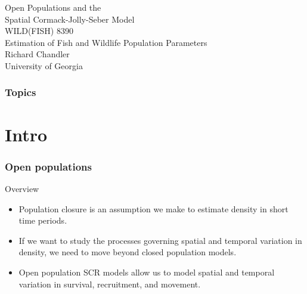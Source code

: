 \documentclass[color=usenames,dvipsnames]{beamer}\usepackage[]{graphicx}\usepackage[]{xcolor}
\begin{document}
\begin{frame}[plain]
  \centering
  \LARGE
  Open Populations and the \\
  Spatial Cormack-Jolly-Seber Model \\
  \vfill
  \large
  WILD(FISH) 8390 \\
  Estimation of Fish and Wildlife Population Parameters \\
  \vfill
  Richard Chandler \\
  University of Georgia \\
\end{frame}







\begin{frame}[plain]
  \frametitle{Topics}
  \Large
\end{frame}




\section{Intro}





\begin{frame}
  \frametitle{Open populations}
  \large
  Overview
  \begin{itemize}[<+->]
    \normalsize
    \item Population closure is an assumption we make to estimate
      density in short time periods.
    \item If we want to study the processes governing spatial
      {and temporal} variation in density, we need to move
      beyond closed population models.
    \item Open population SCR models allow us to model spatial and
      temporal variation in survival, recruitment, and movement.
  \end{itemize}
\end{frame}
\end{document}
